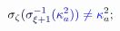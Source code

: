 \documentclass[12pt]{article}
\begin{document}
\makeatletter
\renewcommand*{\@textcolor}[3]{%
  \protect\leavevmode
  \begingroup
    \color#1{#2}#3%
  \endgroup
}
\makeatother
\begin{displaymath}
\mathcolor[RGB]{0,0,15}{\sigma} _ { \mathcolor[RGB]{0,0,30}{\zeta} } \mathcolor[RGB]{0,0,45}{(} \mathcolor[RGB]{0,0,60}{\sigma} _ { \mathcolor[RGB]{0,0,75}{\xi} \mathcolor[RGB]{0,0,90}{+} \mathcolor[RGB]{0,0,105}{1} } ^ { \mathcolor[RGB]{0,0,120}{-} \mathcolor[RGB]{0,0,135}{1} } \mathcolor[RGB]{0,0,150}{(} \mathcolor[RGB]{0,0,165}{\kappa} _ { \mathcolor[RGB]{0,0,180}{a} } ^ { \mathcolor[RGB]{0,0,195}{2} } \mathcolor[RGB]{0,0,210}{)} \mathcolor[RGB]{0,0,225}{)} \mathcolor[RGB]{0,0,240}{\neq} \mathcolor[RGB]{0,0,255}{\kappa} _ { \mathcolor[RGB]{0,15,0}{a} } ^ { \mathcolor[RGB]{0,15,15}{2} } \mathcolor[RGB]{0,15,30}{;}
\end{displaymath}
\end{document}
